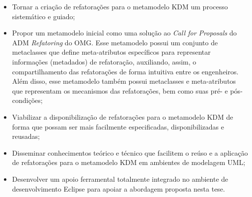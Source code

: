 \begin{itemize}

    \item Tornar a criação de refatorações para o metamodelo KDM um processo sistemático e guiado;
    
    \item Propor um metamodelo inicial como uma solução ao \textit{Call for Proposals} do ADM \textit{Refatoring} do OMG. Esse metamodelo possui um conjunto de metaclasses que define meta-atributos específicos para representar informações (metadados) de refatoração, auxiliando, assim, o compartilhamento das refatorações de forma intuitiva entre os engenheiros. Além disso, esse metamodelo também possui metaclasses e meta-atributos que representam os mecanismos das refatorações, bem como suas pré- e pós-condições;
    
    \item Viabilizar a disponibilização de refatorações para o metamodelo KDM de forma que possam ser mais facilmente especificadas, disponibilizadas e reusadas; 
    
    \item Disseminar conhecimentos teórico e técnico que facilitem o reúso e a aplicação de refatorações para o metamodelo KDM em ambientes de modelagem UML;
    

	
	
	
	
	
    \item Desenvolver um apoio ferramental totalmente integrado no ambiente de desenvolvimento Eclipse para apoiar a abordagem proposta nesta tese.

\end{itemize}




